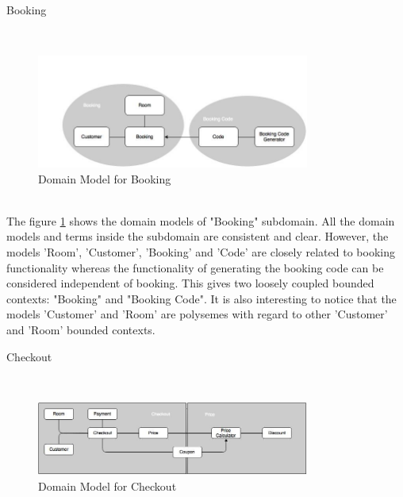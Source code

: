 \begin{shaded} Booking \end{shaded}
\\
\begin{figure}[H]
\begin{center}
\includegraphics[width=0.8\textwidth]{figures/domain-driven-design-three}
\caption{Domain Model for Booking}
\label{fig:domain_driven_design/example_scenario/subdomains/booking}
\end{center}
\end{figure}
\\
The figure \ref{fig:domain_driven_design/example_scenario/subdomains/booking} shows the domain models of "Booking" subdomain. All the domain models and terms inside the subdomain are consistent and clear. However, the models 'Room', 'Customer', 'Booking' and 'Code' are closely related to booking functionality whereas the functionality of generating the booking code can be considered independent of booking. This gives two loosely coupled bounded contexts: "Booking" and "Booking Code". It is also interesting to notice that the models 'Customer' and 'Room' are polysemes with regard to other 'Customer' and 'Room' bounded contexts.\\
\begin{shaded} Checkout \end{shaded}
\\
\begin{figure}[H]
\begin{center}
\includegraphics[width=0.8\textwidth]{figures/domain-driven-design-four}
\caption{Domain Model for Checkout}
\label{fig:domain_driven_design/example_scenario/subdomains/checkout}
\end{center}
\end{figure}
